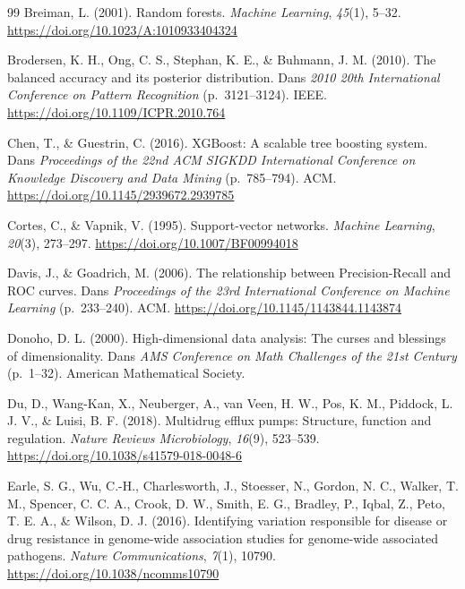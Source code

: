 \documentclass[11pt,a4paper]{article}
\begin{document}
\begin{thebibliography}{99}
Breiman, L. (2001). Random forests. \textit{Machine Learning}, \textit{45}(1), 5--32. \url{https://doi.org/10.1023/A:1010933404324}

Brodersen, K. H., Ong, C. S., Stephan, K. E., \& Buhmann, J. M. (2010). The balanced accuracy and its posterior distribution. Dans \textit{2010 20th International Conference on Pattern Recognition} (p.~3121--3124). IEEE. \url{https://doi.org/10.1109/ICPR.2010.764}

Chen, T., \& Guestrin, C. (2016). XGBoost: A scalable tree boosting system. Dans \textit{Proceedings of the 22nd ACM SIGKDD International Conference on Knowledge Discovery and Data Mining} (p.~785--794). ACM. \url{https://doi.org/10.1145/2939672.2939785}

Cortes, C., \& Vapnik, V. (1995). Support-vector networks. \textit{Machine Learning}, \textit{20}(3), 273--297. \url{https://doi.org/10.1007/BF00994018}

Davis, J., \& Goadrich, M. (2006). The relationship between Precision-Recall and ROC curves. Dans \textit{Proceedings of the 23rd International Conference on Machine Learning} (p.~233--240). ACM. \url{https://doi.org/10.1145/1143844.1143874}

Donoho, D. L. (2000). High-dimensional data analysis: The curses and blessings of dimensionality. Dans \textit{AMS Conference on Math Challenges of the 21st Century} (p.~1--32). American Mathematical Society.

Du, D., Wang-Kan, X., Neuberger, A., van Veen, H. W., Pos, K. M., Piddock, L. J. V., \& Luisi, B. F. (2018). Multidrug efflux pumps: Structure, function and regulation. \textit{Nature Reviews Microbiology}, \textit{16}(9), 523--539. \url{https://doi.org/10.1038/s41579-018-0048-6}

Earle, S. G., Wu, C.-H., Charlesworth, J., Stoesser, N., Gordon, N. C., Walker, T. M., Spencer, C. C. A., Crook, D. W., Smith, E. G., Bradley, P., Iqbal, Z., Peto, T. E. A., \& Wilson, D. J. (2016). Identifying variation responsible for disease or drug resistance in genome-wide association studies for genome-wide associated pathogens. \textit{Nature Communications}, \textit{7}(1), 10790. \url{https://doi.org/10.1038/ncomms10790}


\end{thebibliography}
\end{document}
